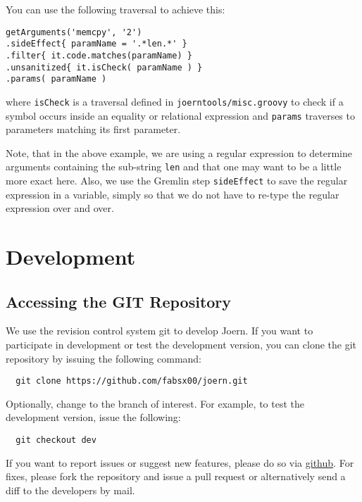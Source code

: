 \documentclass[a4paper]{article}
\newcommand{\code}[1]{\texttt{\small #1}}
\begin{document}
You can use the following traversal to achieve this:

\begin{verbatim}
getArguments('memcpy', '2')
.sideEffect{ paramName = '.*len.*' }
.filter{ it.code.matches(paramName) }
.unsanitized{ it.isCheck( paramName ) }
.params( paramName )
\end{verbatim}

where \code{isCheck} is a traversal defined in
\code{joerntools/misc.groovy} to check if a symbol occurs inside an
equality or relational expression and \code{params} traverses to
parameters matching its first parameter.

Note, that in the above example, we are using a regular
expression to determine arguments containing the sub-string \code{len}
and that one may want to be a little more exact here. Also, we use the
Gremlin step \code{sideEffect} to save the regular expression in a
variable, simply so that we do not have to re-type the regular
expression over and over.

\section{Development}
\label{sec:development}

\subsection{Accessing the GIT Repository}

We use the revision control system git to develop Joern. If you want
to participate in development or test the development version, you can
clone the git repository by issuing the following command:

\begin{verbatim}
  git clone https://github.com/fabsx00/joern.git
\end{verbatim}

Optionally, change to the branch of interest. For example, to test the
development version, issue the following:

\begin{verbatim}
  git checkout dev
\end{verbatim}

If you want to report issues or suggest new features, please do so via
\href{https://github.com/fabsx00/joern}{github}. For fixes, please
fork the repository and issue a pull request or alternatively send a
diff to the developers by mail.
\end{document}
